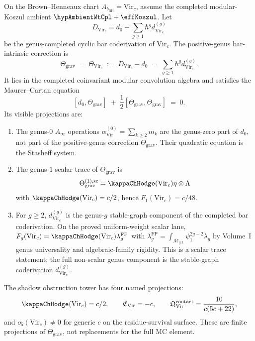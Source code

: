 \begin{theorem}
\label{thm:gravity-mc-package}
On the Brown--Henneaux chart \(A_{b_{\mathrm{BH}}}=\mathrm{Vir}_c\),
assume the completed modular-Koszul ambient
\(\hypAmbientWtCpl+\effKoszul\).  Let
\[
D_{\mathrm{Vir}_c}
=d_0+\sum_{g\ge1}\hbar^g d_{\mathrm{Vir}_c}^{(g)}
\]
be the genus-completed cyclic bar coderivation of
\(\mathrm{Vir}_c\).  The positive-genus bar-intrinsic correction is
\begin{equation}\label{eq:grav-mc-element}
\Theta_{\mathrm{grav}}
\;=\;
\Theta_{\mathrm{Vir}_c}
\;:=\;
D_{\mathrm{Vir}_c}-d_0
\;=\;
\sum_{g\ge1}\hbar^g d_{\mathrm{Vir}_c}^{(g)} .
\end{equation}
It lies in the completed coinvariant modular convolution algebra and
satisfies the Maurer--Cartan equation
\[
[d_0,\Theta_{\mathrm{grav}}]
\;+\;
\frac12[\Theta_{\mathrm{grav}},\Theta_{\mathrm{grav}}]
\;=\;0 .
\]
Its visible projections are:
\begin{enumerate}[label=\textup{(\roman*)}]
\item The genus-$0$ \(A_\infty\) operations
 \(\alpha^{(0)}_{\mathrm{Vir}}=\sum_{k\ge2}m_k\) are the
 genus-zero part of \(d_0\), not part of the positive-genus
 correction \(\Theta_{\mathrm{grav}}\).  Their quadratic equation is
 the Stasheff system.
\item The genus-$1$ scalar trace of \(\Theta_{\mathrm{grav}}\) is
 \[
 \Theta_{\mathrm{grav}}^{(1),\mathrm{sc}} =
 \kappaChHodge(\mathrm{Vir}_c)\eta \otimes \Lambda
 \]
 with \(\kappaChHodge(\mathrm{Vir}_c)=c/2\), hence
 \(F_1(\mathrm{Vir}_c)=c/48\).
\item For \(g\ge2\), \(d_{\mathrm{Vir}_c}^{(g)}\) is the
 genus-\(g\) stable-graph component of the completed bar
 coderivation.  On the proved uniform-weight scalar lane,
 $F_g(\mathrm{Vir}_c)
 = \kappaChHodge(\mathrm{Vir}_c)\lambda_g^{\mathrm{FP}}$ with
 $\lambda_g^{\mathrm{FP}}
 = \int_{\overline{\mathcal{M}}_{g,1}}\psi_1^{2g-2}\lambda_g$
 by Volume~I genus universality and algebraic-family rigidity.
 This is a scalar trace statement; the full non-scalar genus component
 is the stable-graph coderivation \(d_{\mathrm{Vir}_c}^{(g)}\).
\end{enumerate}
The shadow obstruction tower has four named projections:
\[
\kappaChHodge(\mathrm{Vir}_c)=c/2,\qquad
\mathfrak{C}_{\mathrm{Vir}}=-c,\qquad
\mathfrak{Q}^{\mathrm{contact}}_{\mathrm{Vir}}
=\frac{10}{c(5c+22)},
\]
and \(o_5(\mathrm{Vir}_c)\ne0\) for generic \(c\) on the
residue-survival surface.  These are finite projections of
\(\Theta_{\mathrm{grav}}\), not replacements for the full MC element.
\end{theorem}

